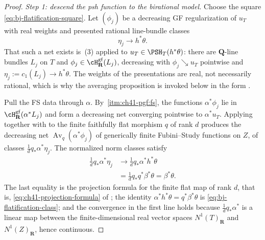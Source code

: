 \begin{proof}
\medskip
\noindent\emph{Step 1: descend the psh function to the birational model.}
Choose the square \eqref{eq:bj-flatification-square}.  Let
$(\phi_j)$ be a decreasing GF regularization of $u_T$ with real weights
and presented rational line-bundle classes
\[
                              \eta_j\longrightarrow h^*\theta.
\]
That such a net exists is \,(3) applied to
$u_T\in\PSH_T(h^*\theta)$: there are $\mathbf Q$-line bundles $L_j$
on $T$ and $\phi_j\in\cH^{\mathrm{gf}}_{\mathbf R}(L_j)$, decreasing
with $\phi_j\searrow u_T$ pointwise and
$\eta_j:=c_1(L_j)\to h^*\theta$.  The weights of the presentations are
real, not necessarily rational, which is why the averaging proposition is
invoked below in the form .

Pull the FS data through $\alpha$.  By
\,\cref{itm:ch41-pgf:fs}, the functions
$\alpha^*\phi_j$ lie in
$\cH^{\mathrm{gf}}_{\mathbf R}(\alpha^*L_j)$ and form a decreasing net
converging pointwise to $\alpha^*u_T$.  Applying
 together with
 to the finite faithfully flat morphism $q$ of
rank $d$ produces the decreasing net
$\operatorname{Av}_q(\alpha^*\phi_j)$ of generically finite Fubini--Study
functions on $Z$, of classes $\frac1dq_*\alpha^*\eta_j$.
The normalized norm classes satisfy
\[
 \begin{aligned}
 \frac1dq_*\alpha^*\eta_j
 &\longrightarrow\frac1dq_*\alpha^*h^*\theta\\
 &=\frac1dq_*q^*\beta^*\theta
  =\beta^*\theta.
 \end{aligned}
\tag{41.41}\label{eq:bj-norm-stage-classes}
\]
The last equality is the projection formula for the finite flat map of
rank $d$, that is, \eqref{eq:ch41-projection-formula} of
; the identity
$\alpha^*h^*\theta=q^*\beta^*\theta$ is
\eqref{eq:bj-flatification-class}; and the convergence in the first line
holds because $\frac1dq_*\alpha^*$ is a linear map between the
finite-dimensional real vector spaces $N^1(T)_{\mathbf R}$ and
$N^1(Z)_{\mathbf R}$, hence continuous.


\end{proof}
